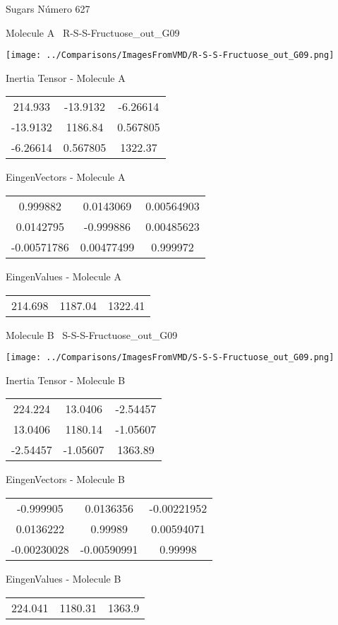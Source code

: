 \vtab[-3cm]
\begin{center}
{\large Sugars \tab Número 627}
\end{center}
\begin{multicols}{2}
\begin{center}

Molecule A \
R-S-S-Fructuose\_out\_G09

\texttt{[image: ../Comparisons/ImagesFromVMD/R-S-S-Fructuose\_out\_G09.png]}

Inertia Tensor - Molecule A \\
\begin{tabular}{|c c c|}
214.933	 & 	-13.9132	 & 	-6.26614	 \\
-13.9132	 & 	1186.84	 & 	0.567805	 \\
-6.26614	 & 	0.567805	 & 	1322.37
\end{tabular}

\vtab
 EingenVectors - Molecule A     \\
\begin{tabular}{|c c c|}
0.999882	 & 	0.0143069	 & 	0.00564903	 \\
0.0142795	 & 	-0.999886	 & 	0.00485623	 \\
-0.00571786	 & 	0.00477499	 & 	0.999972
\end{tabular}

\vtab
 EingenValues - Molecule A     \\
\begin{tabular}{|c c c|}
214.698	 & 	1187.04	 & 	1322.41	 \\
\end{tabular}
\columnbreak

Molecule B \
S-S-S-Fructuose\_out\_G09

\texttt{[image: ../Comparisons/ImagesFromVMD/S-S-S-Fructuose\_out\_G09.png]}

Inertia Tensor - Molecule B \\
\begin{tabular}{|c c c|}
224.224	 & 	13.0406	 & 	-2.54457	 \\
13.0406	 & 	1180.14	 & 	-1.05607	 \\
-2.54457	 & 	-1.05607	 & 	1363.89
\end{tabular}

\vtab
 EingenVectors - Molecule B     \\
\begin{tabular}{|c c c|}
-0.999905	 & 	0.0136356	 & 	-0.00221952	 \\
0.0136222	 & 	0.99989	 & 	0.00594071	 \\
-0.00230028	 & 	-0.00590991	 & 	0.99998
\end{tabular}

\vtab
 EingenValues - Molecule B     \\
\begin{tabular}{|c c c|}
224.041	 & 	1180.31	 & 	1363.9	 \\
\end{tabular}

\end{center}
\end{multicols}

